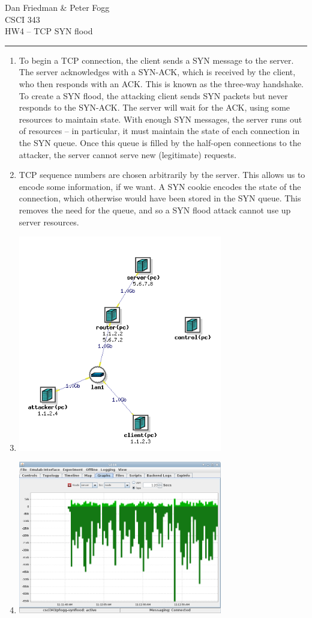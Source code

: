 \documentclass[11pt]{article}
\renewcommand{\maketitle}{
  \begin{center}
    \begin{flushright}
      Dan Friedman \& Peter Fogg \\
      CSCI 343 \\
      HW4 -- TCP SYN flood
    \end{flushright}
    \rule{\linewidth}{0.1mm}
  \end{center}
}
\begin{document}
\maketitle
\begin{enumerate}
\item To begin a TCP connection, the client sends a SYN message to the server. The server acknowledges with a SYN-ACK, which is received by the client, who then responds with an ACK. This is known as the three-way handshake. To create a SYN flood, the attacking client sends SYN packets but never responds to the SYN-ACK. The server will wait for the ACK, using some resources to maintain state. With enough SYN messages, the server runs out of resources -- in particular, it must maintain the state of each connection in the SYN queue. Once this queue is filled by the half-open connections to the attacker, the server cannot serve new (legitimate) requests.
\item TCP sequence numbers are chosen arbitrarily by the server. This allows us to encode some information, if we want. A SYN cookie encodes the state of the connection, which otherwise would have been stored in the SYN queue. This removes the need for the queue, and so a SYN flood attack cannot use up server resources.
\item \text{}
  \begin{center}
    \includegraphics[width=3.5in]{topology.png}
  \end{center}
\newpage
\item \text{}
  \begin{center}
    \includegraphics[width=3.5in]{green-traffic.png}

\end{center}
\end{enumerate}
\end{document}
